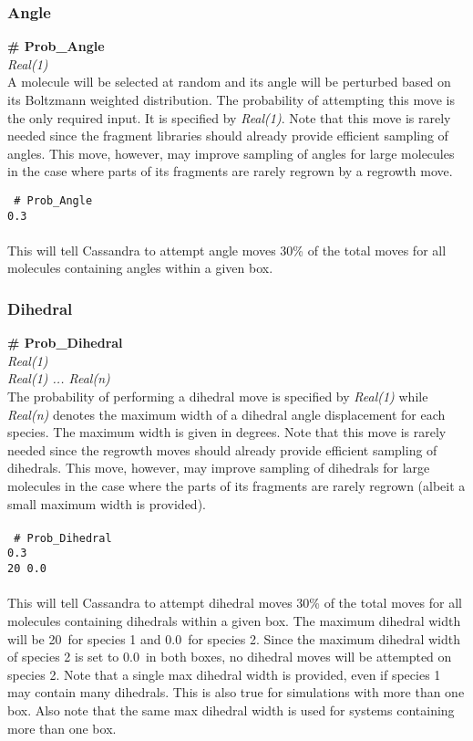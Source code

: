 \subsubsection{Angle}
{\bf \# Prob\_Angle} \\
{\it Real(1)} \\ 
A molecule will be selected at random and its angle will be perturbed based on its Boltzmann weighted distribution.
The probability of attempting this move is the only required input. It is specified by {\it Real(1)}. Note that this move is rarely needed since the fragment libraries should already provide efficient sampling of angles. This move, however, may improve sampling of angles for large molecules in the case where parts of its fragments are rarely regrown by a regrowth move. 

%
\texttt{
\# Prob\_Angle \\
0.3 \\
} \\
%
This will tell Cassandra to attempt angle moves 30\% of the total moves for all molecules containing angles within a given box.

%
%
\subsubsection{Dihedral}
{\bf \# Prob\_Dihedral} \\
{\it Real(1)} \\ 
{\it Real(1) ... Real(n)} \\

The probability of performing a dihedral move is specified by {\it Real(1)} while
{\it Real(n)} denotes the maximum width of a dihedral angle displacement for each species. The maximum width is given in degrees. Note that this move is rarely needed since the regrowth moves should already provide efficient sampling of dihedrals. This move, however, may improve sampling of dihedrals for large molecules in the case where the parts of its fragments are rarely regrown (albeit a small maximum width is provided).\\ \\
%
\texttt{
\# Prob\_Dihedral \\
0.3 \\
20 0.0 \\
}\\
%
This will tell Cassandra to attempt dihedral moves 30\% of the total moves for all molecules containing dihedrals within a given box.
The maximum dihedral width will be 20\degree\ for species 1 and 0.0\degree\
for species 2. Since the maximum dihedral
width of species 2 is set to 0.0\degree\ in both boxes, no dihedral moves will be
attempted on species 2. Note that a single max dihedral width is provided, even if species 1 may contain many dihedrals. This is also true
for simulations with more than one box. Also note that the same max dihedral width is used for systems containing  more than one box.

